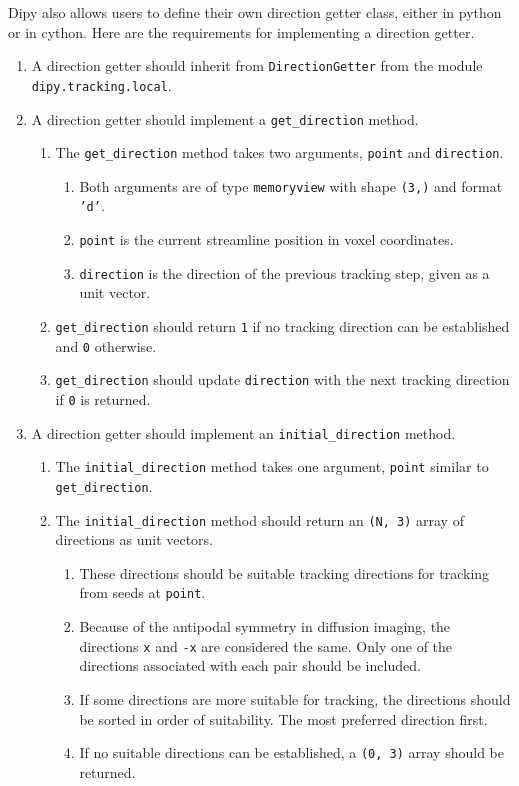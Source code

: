 Dipy also allows users to define their own direction getter class, either in python or in cython. Here are the requirements for implementing a direction getter.
\begin{enumerate}
\item A direction getter should inherit from \texttt{DirectionGetter} from the module \texttt{dipy.tracking.local}.
\item A direction getter should implement a \texttt{get_direction} method.
\begin{enumerate}
\item The \texttt{get_direction} method takes two arguments, \texttt{point} and \texttt{direction}.
\begin{enumerate}
\item Both arguments are of type \texttt{memoryview} with shape \texttt{(3,)} and format \texttt{'d'}.
\item \texttt{point} is the current streamline position in voxel coordinates.
\item \texttt{direction} is the direction of the previous tracking step, given as a unit vector.
\end{enumerate}
\item \texttt{get_direction} should return \texttt{1} if no tracking direction can be established and \texttt{0} otherwise.
\item \texttt{get_direction} should update \texttt{direction} with the next tracking direction if \texttt{0} is returned.
\end{enumerate}
\item A direction getter should implement an \texttt{initial_direction} method.
\begin{enumerate}
\item The \texttt{initial_direction} method takes one argument, \texttt{point} similar to \texttt{get_direction}.
\item The \texttt{initial_direction} method should return an \texttt{(N, 3)} array of directions as unit vectors.
\begin{enumerate}
\item These directions should be suitable tracking directions for tracking from seeds at \texttt{point}.
\item Because of the antipodal symmetry in diffusion imaging, the directions \texttt{x} and \texttt{-x} are considered the same. Only one of the directions associated with each pair should be included.
\item If some directions are more suitable for tracking, the directions should be sorted in order of suitability. The most preferred direction first.  
\item If no suitable directions can be established, a \texttt{(0, 3)} array should be returned.
\end{enumerate}
\end{enumerate}
\end{enumerate}

